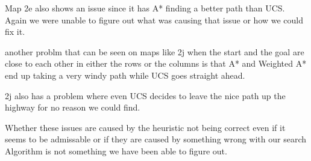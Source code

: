 \documentclass[11pt]{article} %
\begin{document}
Map 2e also shows an issue since it has A* finding a better path than UCS. Again we were unable to figure out what was causing that issue or how we could fix it.

another problm that can be seen on maps like 2j when the start and the goal are close to each other in either the rows or the columns is that A* and Weighted A* end up taking a very windy path while UCS goes straight ahead.
 
 2j also has a problem where even UCS decides to leave the nice path up the highway for no reason we could find. 

Whether these issues are caused by the heuristic not being correct even if it seems to be admissable or if they are caused by something wrong with our search Algorithm is not something we have been able to figure out. 
\end{document}

